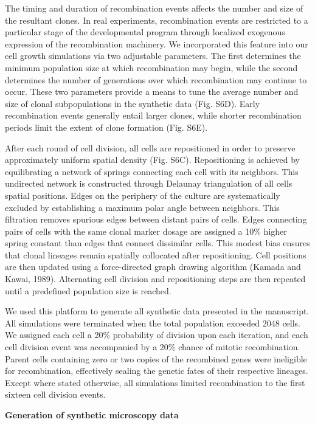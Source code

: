 The timing and duration of recombination events affects the number and size of the resultant clones. In real experiments, recombination events are restricted to a particular stage of the developmental program through localized exogenous expression of the recombination machinery. We incorporated this feature into our cell growth simulations via two adjustable parameters. The first determines the minimum population size at which recombination may begin, while the second determines the number of generations over which recombination may continue to occur. These two parameters provide a means to tune the average number and size of clonal subpopulations in the synthetic data (Fig. S6D). Early recombination events generally entail larger clones, while shorter recombination periods limit the extent of clone formation (Fig. S6E).

After each round of cell division, all cells are repositioned in order to preserve approximately uniform spatial density (Fig. S6C). Repositioning is achieved by equilibrating a network of springs connecting each cell with its neighbors. This undirected network is constructed through Delaunay triangulation of all cells spatial positions. Edges on the periphery of the culture are systematically excluded by establishing a maximum polar angle between neighbors. This filtration removes spurious edges between distant pairs of cells. Edges connecting pairs of cells with the same clonal marker dosage are assigned a 10\% higher spring constant than edges that connect dissimilar cells. This modest bias ensures that clonal lineages remain spatially collocated after repositioning. Cell positions are then updated using a force-directed graph drawing algorithm (Kamada and Kawai, 1989). Alternating cell division and repositioning steps are then repeated until a predefined population size is reached.

We used this platform to generate all synthetic data presented in the manuscript. All simulations were terminated when the total population exceeded 2048 cells. We assigned each cell a 20\% probability of division upon each iteration, and each cell division event was accompanied by a 20\% chance of mitotic recombination. Parent cells containing zero or two copies of the recombined genes were ineligible for recombination, effectively sealing the genetic fates of their respective lineages. Except where stated otherwise, all simulations limited recombination to the first sixteen cell division events.

\textbf{Generation of synthetic microscopy data}

